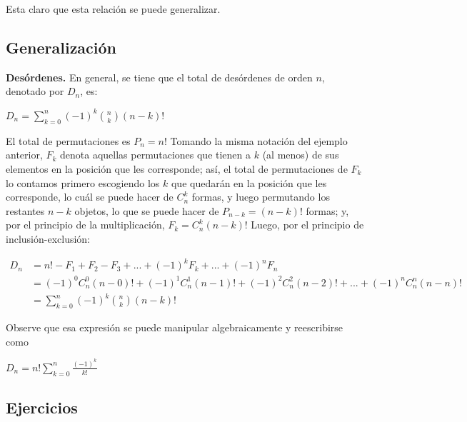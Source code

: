 \documentclass[12pt]{article}
\begin{document}
Esta claro que esta relación se puede generalizar.

\subsection{Generalización}

\begin{teorema}
    \textbf{Desórdenes.} En general, se tiene que el total de desórdenes de orden $n$, denotado por $D_n$, es:

    \begin{center}
        $D_n = \displaystyle\sum_{k=0}^{n} (-1)^{k} \binom{n}{k} (n-k)!$
    \end{center}
\end{teorema}

\begin{demostracion}
    El total de permutaciones es $P_n = n!$ Tomando la misma notación del ejemplo anterior, $F_k$ denota aquellas permutaciones que tienen a $k$ (al menos) de sus elementos en la posición que les corresponde; así, el total de permutaciones de $F_k$ lo contamos primero escogiendo los $k$ que quedarán en la posición que les corresponde, lo cuál se puede hacer de $C^k_n$ formas, y luego permutando los restantes $n-k$ objetos, lo que se puede hacer de $P_{n-k}= (n-k)!$ formas; y, por el principio de la multiplicación, $F_k = C^k_n (n-k)!$ Luego, por el principio de inclusión-exclusión:

    \begin{align*}
        D_n & = n!-F_1+F_2-F_3+ ... + (-1)^k F_k + ... + (-1)^n F_n \\
        & = (-1)^0 C^0_n (n-0)! + (-1)^1 C^1_n (n-1)! + (-1)^2 C^2_n (n-2)! + ... + (-1)^n C^n_n (n-n)! \\
        & = \displaystyle\sum_{k=0}^{n} (-1)^{k} \binom{n}{k} (n-k)!
    \end{align*}
\end{demostracion}

Observe que esa expresión se puede manipular algebraicamente y reescribirse como

\begin{center}
    $D_n = n! \displaystyle\sum_{k=0}^{n} \frac{(-1)^{k}}{k!}$
\end{center}

\subsection{Ejercicios}
\end{document}
